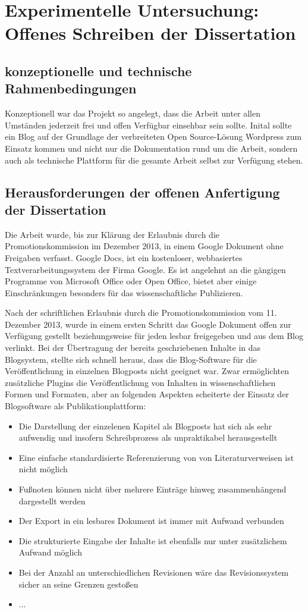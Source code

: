 \chapter{Experimentelle Untersuchung: Offenes Schreiben der Dissertation}


\section{konzeptionelle und technische Rahmenbedingungen}

Konzeptionell war das Projekt so angelegt, dass die Arbeit unter allen Umständen jederzeit frei und offen Verfügbar einsehbar sein sollte. Inital sollte ein Blog auf der Grundlage der verbreiteten Open Source-Lösung Wordpress zum Einsatz kommen und nicht nur die Dokumentation rund um die Arbeit, sondern auch als technische Plattform für die gesamte Arbeit selbst zur Verfügung stehen.

\section{Herausforderungen der offenen Anfertigung der Dissertation}

Die Arbeit wurde, bis zur Klärung der Erlaubnis durch die Promotionskommission im Dezember 2013, in einem Google Dokument ohne Freigaben verfasst. Google Docs, ist ein kostenloser, webbasiertes Textverarbeitungssystem der Firma Google. Es ist angelehnt an die gängigen Programme von Microsoft Office oder Open Office, bietet aber einige Einschränkungen besonders für das wissenschaftliche Publizieren.

Nach der schriftlichen Erlaubnis durch die Promotionskommission vom 11. Dezember 2013, wurde in einem ersten Schritt das Google Dokument offen zur Verfügung gestellt beziehungsweise für jeden lesbar freigegeben und aus dem Blog verlinkt. Bei der Übertragung der bereits geschriebenen Inhalte in das Blogsystem, stellte sich schnell heraus, dass die Blog-Software für die Veröffentlichung in einzelnen Blogposts nicht geeignet war. Zwar ermöglichten zusätzliche Plugins die Veröffentlichung von Inhalten in wissenschaftlichen Formen und Formaten, aber an folgenden Aspekten scheiterte der Einsatz der Blogsoftware als Publikationplattform:
\begin{itemize}
\item Die Darstellung der einzelenen Kapitel als Blogposts hat sich als sehr aufwendig und insofern Schreibprozess als unpraktikabel herausgestellt
\item Eine einfache standardisierte Referenzierung von von Literaturverweisen ist nicht möglich
\item Fußnoten können nicht über mehrere Einträge hinweg zusammenhängend dargestellt werden
\item Der Export in ein lesbares Dokument ist immer mit Aufwand verbunden
\item Die strukturierte Eingabe der Inhalte ist ebenfalls nur unter zusätzlichem Aufwand möglich
\item Bei der Anzahl an unterschiedlichen Revisionen wäre das Revisionssystem sicher an seine Grenzen gestoßen
\item ...
\end{itemize}